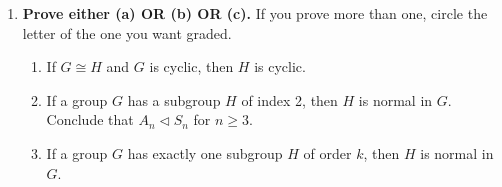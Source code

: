 \documentclass[fleqn,12pt]{article}
\newcommand{\<}{\ensuremath{\langle}}
\renewcommand{\>}{\ensuremath{\rangle}}
\begin{document}
\begin{enumerate}[{\bf 1.}]
\newpage
\item {\bf Prove either (a) OR (b) OR (c).} If you prove more than one, circle
  the letter of the one you want graded.

\begin{enumerate}
\item
If $G \cong H$ and $G$ is cyclic, then $H$ is cyclic.

\item If a group $G$ has a subgroup $H$ of index 2, then $H$ is
normal in $G$. \\
Conclude that $A_n \triangleleft S_n$ for $n \geq 3$.

\item 
If a group $G$ has exactly one subgroup $H$ of order $k$, then
$H$ is normal in $G$. 

\end{enumerate}




\end{enumerate}
\end{document}
